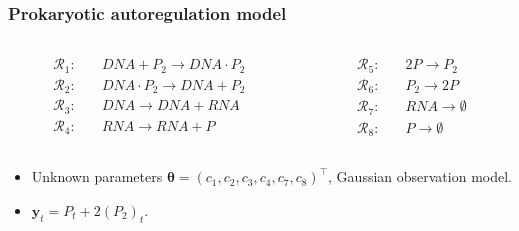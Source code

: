 \documentclass{beamer}
\newcommand{\by}{\bm{y}}
\newcommand{\btheta}{\bm{\theta}}
\begin{document}
    \begin{frame}
    \frametitle{Prokaryotic autoregulation model}
    \begin{columns}
        \begin{column}{0.4\textwidth}
            \begin{equation*}
            \begin{split}
            \mathcal{R}_1:\quad & \mathit{DNA} + P_2 \to \mathit{DNA} \cdot P_2 \\
            \mathcal{R}_2:\quad & \mathit{DNA} \cdot P_2 \to \mathit{DNA} + P_2 \\
            \mathcal{R}_3:\quad & \mathit{DNA} \to \mathit{DNA} + \mathit{RNA} \\
            \mathcal{R}_4:\quad & \mathit{RNA} \to \mathit{RNA} + P
            \end{split}
            \end{equation*}
        \end{column}
%
        \begin{column}{0.4\textwidth}
            \begin{equation*}
            \begin{split}
            \mathcal{R}_5:\quad & 2P \to P_2 \\
            \mathcal{R}_6:\quad & P_2 \to 2P \\
            \mathcal{R}_7:\quad & \mathit{RNA} \to \emptyset \\
            \mathcal{R}_8:\quad & P \to \emptyset
            \end{split}
            \end{equation*}
        \end{column}
    \end{columns}

    \begin{itemize}
        \item Unknown parameters $\btheta = \left(c_1, c_2, c_3, c_4, c_7, c_8\right)^\intercal$, Gaussian observation model.
        \item $\by_t = P_t + 2(P_2)_t$.
    \end{itemize}
    \end{frame}
\end{document}
